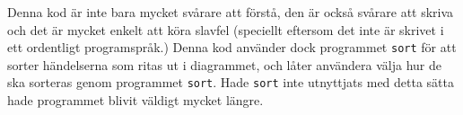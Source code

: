 \documentclass[12pt,a4paper]{article}
\begin{document}
Denna kod är inte bara mycket svårare att förstå,
den är också svårare att skriva och det är mycket
enkelt att köra slavfel (speciellt eftersom det
inte är skrivet i ett ordentligt programspråk.)
Denna kod använder dock programmet \texttt{sort}
för att sorter händelserna som ritas ut i diagrammet,
och låter användera välja hur de ska sorteras genom
programmet \texttt{sort}. Hade \texttt{sort} inte
utnyttjats med detta sätta hade programmet blivit
väldigt mycket längre.
\end{document}
